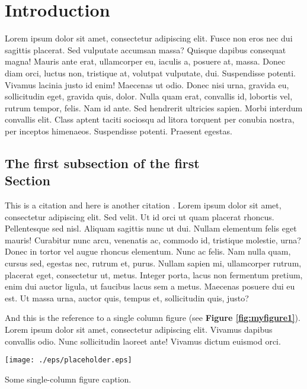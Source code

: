 \section{Introduction}

Lorem ipsum dolor sit amet, consectetur adipiscing elit.  Fusce non eros nec dui
sagittis placerat. Sed vulputate accumsan massa? Quisque dapibus consequat
magna! Mauris ante erat, ullamcorper eu, iaculis a, posuere at, massa. Donec
diam orci, luctus non, tristique at, volutpat vulputate, dui.  Suspendisse
potenti. Vivamus lacinia justo id enim! Maecenas ut odio. Donec nisi urna,
gravida eu, sollicitudin eget, gravida quis, dolor. Nulla quam erat, convallis
id, lobortis vel, rutrum tempor, felis. Nam id ante. Sed hendrerit ultricies
sapien. Morbi interdum convallis elit. Class aptent taciti sociosqu ad litora
torquent per conubia nostra, per inceptos himenaeos. Suspendisse potenti.
Praesent egestas.


\subsection{The first subsection of the first \\ Section}

This is a citation \cite{Norman09Learn} and here is another citation
\cite{Peyton93Howto}.  Lorem ipsum dolor sit amet, consectetur adipiscing elit.
Sed velit. Ut id orci ut quam placerat rhoncus. Pellentesque sed nisl. Aliquam
sagittis nunc ut dui.  Nullam elementum felis eget mauris! Curabitur nunc arcu,
venenatis ac, commodo id, tristique molestie, urna? Donec in tortor vel augue
rhoncus elementum. Nunc ac felis. Nam nulla quam, cursus sed, egestas nec,
rutrum et, purus. Nullam sapien mi, ullamcorper rutrum, placerat eget,
consectetur ut, metus. Integer porta, lacus non fermentum pretium, enim dui
auctor ligula, ut faucibus lacus sem a metus. Maecenas posuere dui eu est. Ut
massa urna, auctor quis, tempus et, sollicitudin quis, justo?


And this is the reference to a single column figure (see {\bf Figure
\ref{fig:myfigure1}}).  Lorem ipsum dolor sit amet, consectetur adipiscing elit.
Vivamus dapibus convallis odio. Nunc sollicitudin laoreet ante! Vivamus dictum
euismod orci.

\begin{figurehere}
 \centering
 \texttt{[image: ./eps/placeholder.eps]}
 \caption{Some single-column figure caption.}
 \label{fig:myfigure1}
\end{figurehere}



